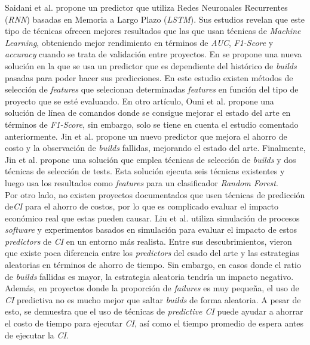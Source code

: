 Saidani et al. \cite{18} propone un predictor que utiliza Redes Neuronales Recurrentes
(\textit{RNN}) basadas en Memoria a Largo Plazo (\textit{LSTM}). Sus estudios revelan que este
tipo de técnicas ofrecen mejores resultados que las que usan técnicas de \textit{Machine
Learning}, obteniendo mejor rendimiento en términos de \textit{AUC}, \textit{F1-Score} y
\textit{accuracy} cuando se trata de validación entre proyectos. En \cite{7} se propone una
nueva solución en la que se usa un predictor que es dependiente del histórico de \textit{builds}
pasadas para poder hacer sus predicciones. En este estudio existen métodos de selección de
\textit{features} que selecionan determinadas \textit{features} en función del tipo de proyecto
que se esté evaluando. En otro artículo, Ouni et al. \cite{17} propone una solución de línea de
comandos donde se consigue mejorar el estado del arte en términos de \textit{F1-Score}, sin
embargo, solo se tiene en cuenta el estudio \cite{8} comentado anteriormente. Jin et al.
\cite{4} propone un nuevo predictor que mejora el ahorro de costo y la observación de
\textit{builds} fallidas, mejorando el estado del arte. Finalmente, Jin et al. \cite{6} propone
una solución que emplea técnicas de selección de \textit{builds} y dos técnicas de selección
de tests. Esta solución ejecuta seis técnicas existentes y luego usa los resultados como
\textit{features} para un clasificador \textit{Random Forest}.\\

Por otro lado, no existen proyectos documentados que usen técnicas de predicción de\textit{CI}
para el ahorro de costos, por lo que es complicado evaluar el impacto económico real que estas
pueden causar. Liu et al. \cite{22} utiliza simulación de procesos \textit{software} y
experimentos basados en simulación para evaluar el impacto de estos \textit{predictors} de
\textit{CI} en un entorno más realista. Entre sus descubrimientos, vieron que existe poca
diferencia entre los \textit{predictors} del esado del arte y las estrategias aleatorias en
términos de ahorro de tiempo. Sin embargo, en casos donde el ratio de \textit{builds} fallidas
es mayor, la estrategia aleatoria tendría un impacto negativo. Además, en proyectos donde la
proporción de \textit{failures} es muy pequeña, el uso de \textit{CI} predictiva no es mucho
mejor que saltar \textit{builds} de forma aleatoria. A pesar de esto, se demuestra que el uso
de técnicas de \textit{predictive CI} puede ayudar a ahorrar el costo de tiempo para ejecutar
\textit{CI}, así como el tiempo promedio de espera antes de ejecutar la \textit{CI}.\\
